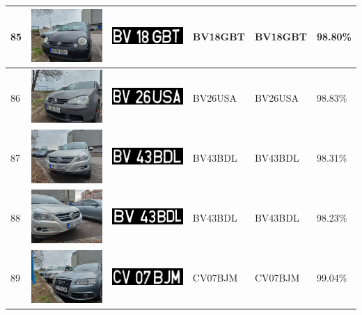 \documentclass[a4paper,12pt]{report}
\begin{document}
\begin{longtable}{| m{0.6cm} | m{3cm} | m{3cm} | m{1.8cm} | m{1.8cm} | m{1.8cm} |}
        85 & \includegraphics[width=3cm,keepaspectratio]{dataset/50_d1.jpg} & \includegraphics[width=3cm,keepaspectratio]{segmentari/85.jpg} & BV18GBT & BV18GBT & 98.80\% \\ \hline
        86 & \includegraphics[width=3cm,keepaspectratio]{dataset/51_d1.jpg} & \includegraphics[width=3cm,keepaspectratio]{segmentari/86.jpg} & BV26USA & BV26USA & 98.83\% \\ \hline
        87 & \includegraphics[width=3cm,keepaspectratio]{dataset/52_d1.jpg} & \includegraphics[width=3cm,keepaspectratio]{segmentari/87.jpg} & BV43BDL & BV43BDL & 98.31\% \\ \hline
        88 & \includegraphics[width=3cm,keepaspectratio]{dataset/52_s1.jpg} & \includegraphics[width=3cm,keepaspectratio]{segmentari/88.jpg} & BV43BDL & BV43BDL & 98.23\% \\ \hline
        89 & \includegraphics[width=3cm,keepaspectratio]{dataset/53_d1.jpg} & \includegraphics[width=3cm,keepaspectratio]{segmentari/89.jpg} & CV07BJM & CV07BJM & 99.04\% \\ \hline

\end{longtable}
\end{document}
